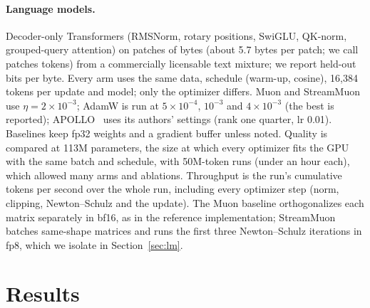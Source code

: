 \documentclass[10pt]{article}
\newcommand{\method}{StreamMuon}\newcommand{\lite}{StreamMuon-Lite}
\begin{document}
\paragraph{Language models.} Decoder-only Transformers (RMSNorm, rotary positions, SwiGLU, QK-norm, grouped-query
attention) on patches of bytes (about 5.7 bytes per patch; we call patches tokens) from a commercially licensable text
mixture; we report held-out bits per byte. Every arm uses the same data, schedule (warm-up, cosine), 16{,}384 tokens per
update and model; only the optimizer differs. Muon and \method{} use $\eta=2\times10^{-3}$; AdamW is run at $5\times10^{-4}$, $10^{-3}$
and $4\times10^{-3}$ (the best is reported); APOLLO~\citep{zhu2025apollo} uses its authors' settings (rank one
quarter, lr 0.01). Baselines keep fp32 weights and a gradient buffer unless noted. Quality is compared at 113M
parameters, the size at which every optimizer fits the GPU with the same batch and schedule, with 50M-token runs (under
an hour each), which allowed many arms and ablations. Throughput is the run's cumulative tokens per second over the whole run, including every optimizer step (norm,
clipping, Newton--Schulz and the update). The Muon
baseline orthogonalizes each matrix separately in bf16, as in the reference implementation; \method{} batches
same-shape matrices and runs the first three Newton--Schulz iterations in fp8, which we isolate in
Section~\ref{sec:lm}.

\section{Results}
\label{sec:results}
\end{document}
